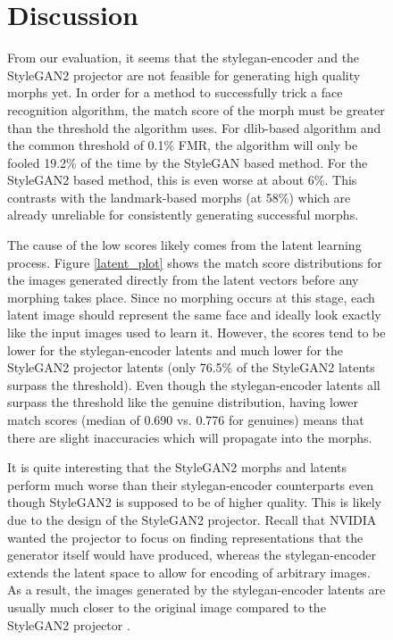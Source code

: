 \documentclass[12pt]{article}
\begin{document}
\begin{figure}[t]
\section{Discussion}
\par
From our evaluation, it seems that the stylegan-encoder and the StyleGAN2 projector are not feasible for generating high quality morphs yet. In order for a method to successfully trick a face recognition algorithm, the match score of the morph must be greater than the threshold the algorithm uses. For dlib-based algorithm and the common threshold of 0.1\% FMR, the algorithm will only be fooled 19.2\% of the time by the StyleGAN based method. For the StyleGAN2 based method, this is even worse at about 6\%. This contrasts with the landmark-based morphs (at 58\%) which are already unreliable for consistently generating successful morphs.
\par
The cause of the low scores likely comes from the latent learning process. Figure \ref{latent_plot} shows the match score distributions for the images generated directly from the latent vectors before any morphing takes place. Since no morphing occurs at this stage, each latent image should represent the same face and ideally look exactly like the input images used to learn it. However, the scores tend to be lower for the stylegan-encoder latents and much lower for the StyleGAN2 projector latents (only 76.5\% of the StyleGAN2 latents surpass the threshold). Even though the stylegan-encoder latents all surpass the threshold like the genuine distribution, having lower match scores (median of 0.690 vs. 0.776 for genuines) means that there are slight inaccuracies which will propagate into the morphs.
\par
It is quite interesting that the StyleGAN2 morphs and latents perform much worse than their stylegan-encoder counterparts even though StyleGAN2 is supposed to be of higher quality. This is likely due to the design of the StyleGAN2 projector. Recall that NVIDIA wanted the projector to focus on finding representations that the generator itself would have produced, whereas the stylegan-encoder extends the latent space to allow for encoding of arbitrary images. As a result, the images generated by the stylegan-encoder latents are usually much closer to the original image compared to the StyleGAN2 projector \cite{stylegan2}.

\end{figure}
\end{document}
